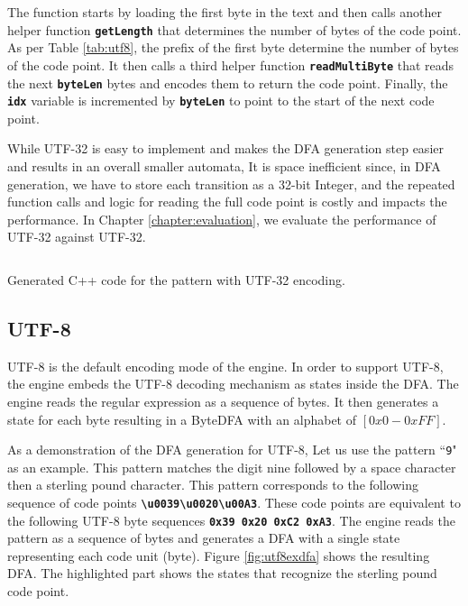 The function starts by loading the first byte in the text and then calls another helper function \texttt{\textbf{getLength}} that determines the number of bytes of the code point. As per Table \ref{tab:utf8}, the prefix of the first byte determine the number of bytes of the code point. It then calls a third helper function \texttt{\textbf{readMultiByte}} that reads the next \texttt{\textbf{byteLen}} bytes and encodes them to return the code point. Finally, the \texttt{\textbf{idx}} variable is incremented by \texttt{\textbf{byteLen}} to point to the start of the next code point.

While UTF-32 is easy to implement and makes the DFA generation step easier and results in an overall smaller automata, It is space inefficient since, in DFA generation, we have to store each transition as a 32-bit Integer, and the repeated function calls and logic for reading the full code point is costly and impacts the performance. In Chapter \ref{chapter:evaluation}, we evaluate the performance of UTF-32 against UTF-32.

\begin{listing}[H]
\inputminted[breaklines=true,frame=lines,linenos,fontsize=\small]{cpp}{code/utf32.cpp}
\caption{Generated C++ code for the pattern \texttt{\textbf{\textsterling}} with UTF-32 encoding.}
\label{lst:utf32nextbyte}
\end{listing}

\subsection{UTF-8}
UTF-8 is the default encoding mode of the engine. In order to support UTF-8, the engine embeds the UTF-8 decoding mechanism as states inside the DFA. The engine reads the regular expression as a sequence of bytes. It then generates a state for each byte resulting in a ByteDFA with an alphabet of $[0x0 - 0xFF]$.

As a demonstration of the DFA generation for UTF-8, Let us use the pattern ``\texttt{9\textvisiblespace \textsterling}" as an example. This pattern matches the digit nine followed by a space character then a sterling pound character. This pattern corresponds to the following sequence of code points \texttt{\textbf{\textbackslash u0039\textbackslash u0020\textbackslash u00A3}}. These code points are equivalent to the following UTF-8 byte sequences \texttt{\textbf{0x39 0x20 0xC2 0xA3}}. The engine reads the pattern as a sequence of bytes and generates a DFA with a single state representing each code unit (byte). Figure \ref{fig:utf8exdfa} shows the resulting DFA. The highlighted part shows the states that recognize the sterling pound code point.

